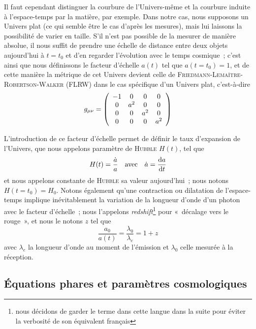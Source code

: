 \documentclass[../main/main.tex]{subfiles}
\begin{document}
Il faut cependant distinguer la courbure de l'Univers-même et la courbure
induite à l'espace-temps par la matière, par exemple. Dans notre cas, nous
supposons un Univers plat (ce qui semble être le cas d'après les mesures), mais
lui laissons la possibilité de varier en taille. S'il n'est pas possible de la
mesurer de manière absolue, il nous suffit de prendre une échelle de distance
entre deux objets aujourd'hui à $t = t_0$ et d'en regarder l'évolution avec le
temps cosmique~; c'est ainsi que nous définissons le facteur d'échelle $a(t)$
tel que $a(t=t_0) = 1$, et de cette manière la métrique de cet Univers devient
celle de \textsc{Friedmann}-\textsc{Lemaître}-\textsc{Robertson}-\textsc{Walker}
(FLRW) dans le cas spécifique d'un Univers plat, c'est-à-dire
\begin{equation}
    g_{\mu\nu} = \left(\begin{array}{c c c c}
            -1 & 0 & 0 & 0\\
            0 & a^2 & 0 & 0\\
            0 & 0 & a^2 & 0\\
            0 & 0 & 0 & a^2\\
    \end{array}\right)
\end{equation}

L'introduction de ce facteur d'échelle permet de définir le taux d'expansion de
l'Univers, que nous appelons paramètre de \textsc{Hubble} $H(t)$, tel que
\begin{equation}\label{eq:hz}
    H(t) = \frac{\dot{a}}{a}\quad\text{avec}\quad\dot{a} = \dv{a}{t}
\end{equation}
et nous appelons constante de \textsc{Hubble} sa valeur aujourd'hui~; nous
notons $H(t=t_0) = H_0$. Notons également qu'une contraction ou dilatation de
l'espace-temps implique inévitablement la variation de la longueur d'onde d'un
photon avec le facteur d'échelle~; nous l'appelons
\textit{redshift}\footnote{nous décidons de garder le terme dans cette langue
dans la suite pour éviter la verbosité de son équivalent français} pour
«~décalage vers le rouge~», et nous le notons $z$ tel que
\begin{equation}\label{eq:z}
    \frac{a_0}{a(t)} = \frac{\lambda_0}{\lambda_e} = 1+z
\end{equation}
avec $\lambda_e$ la longueur d'onde au moment de l'émission et $\lambda_0$ celle
mesurée à la réception.

\subsection{Équations phares et paramètres cosmologiques}\label{ssec:rgeq}
\end{document}
